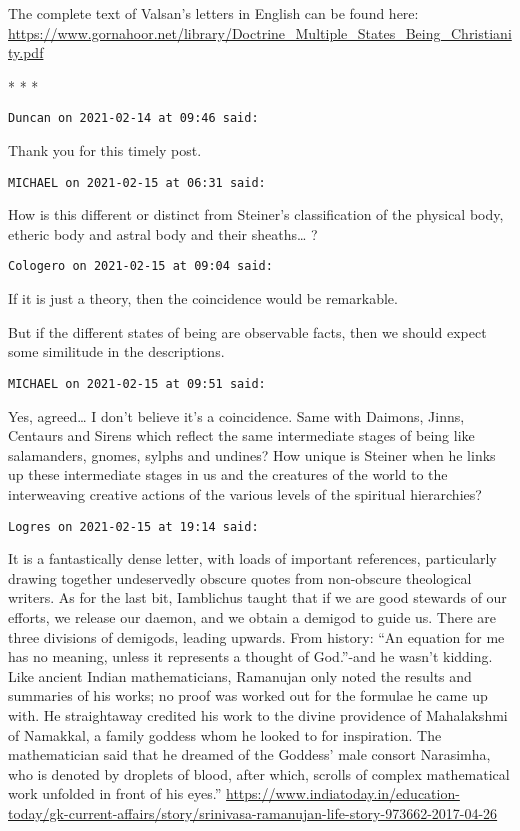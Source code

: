 {The complete text of Valsan's letters in English can be found here: \url{https://www.gornahoor.net/library/Doctrine_Multiple_States_Being_Christianity.pdf}


\begin{center}* * *\end{center}

\begin{footnotesize}\begin{sffamily}



\texttt{Duncan on 2021-02-14 at 09:46 said: }

Thank you for this timely post.


\hfill

\texttt{MICHAEL on 2021-02-15 at 06:31 said: }

How is this different or distinct from Steiner's classification of the physical body, etheric body and astral body and their sheaths… ?


\hfill

\texttt{Cologero on 2021-02-15 at 09:04 said: }

If it is just a theory, then the coincidence would be remarkable.

But if the different states of being are observable facts, then we should expect some similitude in the descriptions.


\hfill

\texttt{MICHAEL on 2021-02-15 at 09:51 said: }

Yes, agreed… I don't believe it's a coincidence. Same with Daimons, Jinns, Centaurs and Sirens which reflect the same intermediate stages of being like salamanders, gnomes, sylphs and undines? How unique is Steiner when he links up these intermediate stages in us and the creatures of the world to the interweaving creative actions of the various levels of the spiritual hierarchies?


\hfill

\texttt{Logres on 2021-02-15 at 19:14 said: }

It is a fantastically dense letter, with loads of important references, particularly drawing together undeservedly obscure quotes from non-obscure theological writers. As for the last bit, Iamblichus taught that if we are good stewards of our efforts, we release our daemon, and we obtain a demigod to guide us. There are three divisions of demigods, leading upwards. From history: “An equation for me has no meaning, unless it represents a thought of God.”-and he wasn't kidding. Like ancient Indian mathematicians, Ramanujan only noted the results and summaries of his works; no proof was worked out for the formulae he came up with. He straightaway credited his work to the divine providence of Mahalakshmi of Namakkal, a family goddess whom he looked to for inspiration. The mathematician said that he dreamed of the Goddess' male consort Narasimha, who is denoted by droplets of blood, after which, scrolls of complex mathematical work unfolded in front of his eyes.” \url{https://www.indiatoday.in/education-today/gk-current-affairs/story/srinivasa-ramanujan-life-story-973662-2017-04-26}


\end{sffamily}
\end{footnotesize}}
